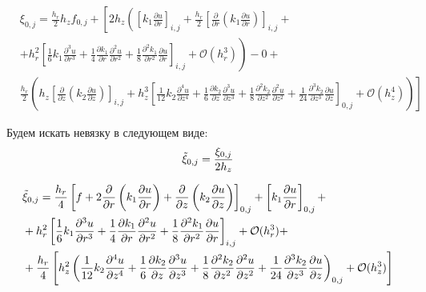 \begin{align*}
  &\xi_{0, j} = \frac{h_r}{2} h_z f_{0, j} + \left[ 2h_z \left( 
    \left[ k_1 \frac{\partial u}{ \partial r} \right]_{i, j} +
    \frac{h_r}{2} \left[ \frac{\partial }{ \partial r} \left( k_1 \frac{\partial u}{ \partial r} \right) \right]_{i, j} +
  \right. \right. \\
  & \left. + h^2_r \left[
    \frac{1}{6}k_1 \frac{\partial^3 u}{ \partial r^3} +
    \frac{1}{4} \frac{\partial k_1}{ \partial r} \frac{\partial^2 u}{ \partial r^2} +
    \frac{1}{8} \frac{\partial^2 k_1}{ \partial r^2} \frac{\partial u}{ \partial r}
  \right]_{i ,j} + \mathcal{O}(h^3_r)
  \right) - 0 + \\
  & \left. \frac{h_r}{2} \left( h_z \left[ \frac{\partial }{ \partial z} \left( k_2 \frac{\partial u}{ \partial z} \right) \right]_{i, j} 
  + h^3_z \left[ 
    \frac{1}{12}k_2 \frac{\partial^4 u}{ \partial z^4}  +
    \frac{1}{6} \frac{\partial k_2}{ \partial z} \frac{\partial^3 u}{ \partial z^3} +
    \frac{1}{8} \frac{\partial^2 k_2}{ \partial z^2} \frac{\partial^2 u}{ \partial z^2} +
    \frac{1}{24} \frac{\partial^3 k_2}{ \partial z^3} \frac{\partial u}{ \partial z} \right]_{0, j}
    + \mathcal{O}(h^4_z)
    \right) \right]
\end{align*}

Будем искать невязку в следующем виде:
\[
  \Tilde{\xi}_{0, j} = \frac{\xi_{0, j}}{2 h_z}
\]

\begin{align*}
  &\Tilde{\xi}_{0, j} = \frac{h_r}{4}
  \left[ f 
  + 2\frac{\partial }{ \partial r} \left( k_1 \frac{\partial u}{ \partial r} \right)
  + \frac{\partial }{ \partial z} \left( k_2 \frac{\partial u}{ \partial z} \right)
 \right]_{0, j}
 + \left[ k_1 \frac{\partial u}{\partial r} \right]_{0, j} +\\
 & + h^2_r \left[
  \frac{1}{6}k_1 \frac{\partial^3 u}{ \partial r^3} +
  \frac{1}{4} \frac{\partial k_1}{ \partial r} \frac{\partial^2 u}{ \partial r^2} +
  \frac{1}{8} \frac{\partial^2 k_1}{ \partial r^2} \frac{\partial u}{ \partial r}
  \right]_{i ,j} + \mathcal{O}(h^3_r) + \\
 & + \frac{h_r}{4}\left[ h^2_z\left( 
  \frac{1}{12}k_2 \frac{\partial^4 u}{ \partial z^4}  +
  \frac{1}{6} \frac{\partial k_2}{ \partial z} \frac{\partial^3 u}{ \partial z^3} +
  \frac{1}{8} \frac{\partial^2 k_2}{ \partial z^2} \frac{\partial^2 u}{ \partial z^2} +
  \frac{1}{24} \frac{\partial^3 k_2}{ \partial z^3} \frac{\partial u}{ \partial z}
  \right)_{0, j}
  + \mathcal{O}(h^3_z) \right]
\end{align*}

